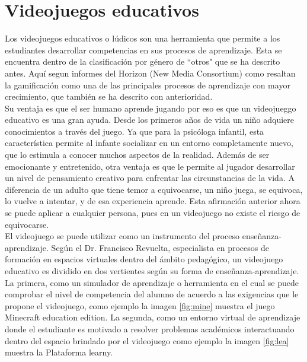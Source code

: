 \section{Videojuegos educativos}

Los videojuegos educativos o lúdicos son una herramienta que permite a los estudiantes desarrollar competencias en sus procesos de aprendizaje. Esta se encuentra dentro de la clasificación por género de ``otros" que se ha descrito antes. Aquí segun informes del Horizon (New Media Consortium) como \cite[Games and gamification]{vid07} resaltan la gamificación como una de las principales procesos de aprendizaje con mayor crecimiento, que también se ha descrito con anterioridad. 
\\[1pt]

Su ventaja es que el ser humano aprende jugando por eso es que un videojueggo educativo es una gran ayuda. Desde los primeros años de vida un niño adquiere conocimientos a través del juego. Ya que para la psicóloga infantil, esta característica permite al infante socializar en un entorno completamente nuevo, que lo estimula a conocer muchos aspectos de la realidad. Además de ser emocionante y entretenido, otra ventaja es que le permite al jugador desarrollar un nivel de pensamiento creativo para enfrentar las circunstancias de la vida. A diferencia de un adulto que tiene temor a equivocarse, un niño juega, se equivoca, lo vuelve a intentar, y de esa experiencia aprende. Esta afirmación anterior ahora se puede aplicar a cualquier persona, pues en un videojuego no existe el riesgo de equivocarse.
\\[1pt]

El videojuego se puede utilizar como un instrumento del proceso enseñanza-aprendizaje. Según el Dr. Francisco Revuelta, especialista en procesos de formación en espacios virtuales dentro del ámbito pedagógico, un videojuego educativo es dividido en dos vertientes según su forma de enseñanza-aprendizaje. La primera, como un simulador de aprendizaje o herramienta en el cual se puede comprobar el nivel de competencia del alumno de acuerdo a las exigencias que le propone el videojuego, como ejemplo la imagen \ref{fig:mine} muestra el juego Minecraft education edition. La segunda, como un entorno virtual de aprendizaje donde el estudiante es motivado a resolver problemas académicos interactuando dentro del espacio brindado por el videojuego\cite{vid06} como ejemplo la imagen \ref{fig:lea} muestra la Plataforma learny.
\\[1pt]

